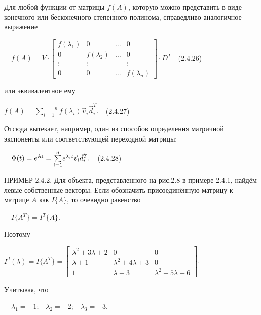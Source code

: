 		Для любой функции от матрицы  $f(A)$, которую можно представить в виде конечного или бесконечного степенного полинома,
		справедливо аналогичное выражение



		\ \  $f(A)=V\cdot \left[\begin{matrix}f(\lambda _1)&0&\ldots &0\\0&f(\lambda _2)&\ldots &0\\\vdots &\vdots &&\vdots \\0&0&\ldots
		&f(\lambda _n)\end{matrix}\right]\cdot D^T$\ \ (2.4.26)



		или эквивалентное ему



		   $f(A)=\overset n{\underset{i=1}{\sum }}f(\lambda _i)\vec v_i\vec d_i^T.$\ \ (2.4.27)



		Отсюда вытекает, например, один из способов определения матричной экспоненты или соответствующей переходной матрицы:



		\ \  $\Phi (t)=e^{\normalsubformula{\text{At}}}=\overset n{\underset{i=1}{\sum }}e^{\lambda _it}\vec v_i\vec d_i^T.$\ \ (2.4.28)



\bigskip


		ПРИМЕР 2.4.2. Для объекта, представленного на рис.2.8 в примере 2.4.1, найдём левые собственные векторы. Если обозначить
		присоединённую матрицу к матрице  $A$ как  $I\{A\}$, то очевидно равенство 



		\ \  $I\{A^T\}=I^T\{A\}$.



		Поэтому



		$I^d(\lambda )=I\{A^T\}=\left[\begin{matrix}\lambda ^2+3\lambda +2&0&0\\\lambda +1&\lambda ^2+4\lambda +3&0\\1&\lambda +3&\lambda ^2+5\lambda +6\end{matrix}\right]$.



		Учитывая, что



		\ \  $\lambda _1=-1;\;\;\;\lambda _2=-2;\;\;\;\lambda _3=-3$,



